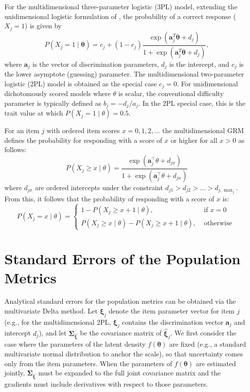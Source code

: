\documentclass[man, 12pt, floatsintext]{apa7}
\begin{document}
For the multidimensional three-parameter logistic (3PL) model, extending the unidimensional logistic formulation of \textcite{Birnbaum1968}, the probability of a correct response ($X_j = 1$) is given by
\begin{equation}\label{eq:m3pl}
P(X_j = 1 \mid \boldsymbol{\theta}) = c_j + (1 - c_j) \frac{\exp(\mathbf{a}_j^T \boldsymbol{\theta} + d_j)}{1 + \exp(\mathbf{a}_j^T \boldsymbol{\theta} + d_j)},
\end{equation}
where $\mathbf{a}_j$ is the vector of discrimination parameters, $d_j$ is the intercept, and $c_j$ is the lower asymptote (guessing) parameter. The multidimensional two-parameter logistic (2PL) model is obtained as the special case $c_j = 0$. For unidimensional dichotomously scored models where $\theta$ is scalar, the conventional difficulty parameter is typically defined as $b_j = -d_j/a_j$. In the 2PL special case, this is the trait value at which $P(X_j = 1 \mid \theta) = 0.5$.


For an item $j$ with ordered item scores $x=0,1,2, \ldots$ the multidimensional GRM defines the probability for responding with a score of $x$ or higher for all $x>0$ as follows:
$$
P\left(X_j \geq x \mid \theta\right)=\frac{\exp \left(\mathbf{a}_j^{\top} \theta+d_{j x}\right)}{1+\exp \left(\mathbf{a}_j^{\top} \theta+d_{j x}\right)}
$$
where $d_{j x}$ are ordered intercepts under the constraint $d_{j 1}>d_{j 2}>\ldots>d_{j, \max _{j}}$. From this, it follows that the probability of responding with a score of $x$ is:
\begin{equation}\label{eq:mgrm}
P\left(X_j=x \mid \theta\right)= \begin{cases}1-P\left(X_j \geq x+1 \mid \theta\right), & \text { if } x=0 \\ P\left(X_j \geq x \mid \theta\right)-P\left(X_j \geq x+1 \mid \theta\right), & \text { otherwise }\end{cases}
\end{equation}

\section{Standard Errors of the Population Metrics}
Analytical standard errors for the population metrics can be obtained via the multivariate Delta method. Let $\boldsymbol{\xi}_j$ denote the item parameter vector for item $j$ (e.g., for the multidimensional 2PL, $\boldsymbol{\xi}_j$ contains the discrimination vector $\mathbf{a}_j$ and intercept $d_j$), and let $\mathbf{\Sigma}_{\hat{\boldsymbol{\xi}}}$ be the covariance matrix of $\hat{\boldsymbol{\xi}}_j$. We first consider the case where the parameters of the latent density $f(\boldsymbol{\theta})$ are fixed (e.g., a standard multivariate normal distribution to anchor the scale), so that uncertainty comes only from the item parameters. When the parameters of $f(\boldsymbol{\theta})$ are estimated jointly, $\mathbf{\Sigma}_{\hat{\boldsymbol{\xi}}}$ must be expanded to the full joint covariance matrix and the gradients must include derivatives with respect to those parameters.
\end{document}
